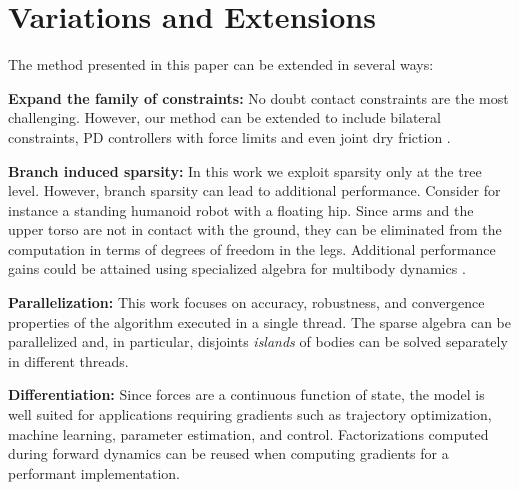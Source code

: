 \section{Variations and Extensions}
\label{sec:variations_and_extensions}

The method presented in this paper can be extended in several ways:

\textbf{Expand the family of constraints:} No doubt contact constraints are the
most challenging. However, our method can be extended to include bilateral
constraints, PD controllers with force limits and even joint dry friction
\cite{bib:todorov2014}.

\textbf{Branch induced sparsity:} In this work we exploit sparsity only at the
tree level. However, branch sparsity can lead to additional performance.
Consider for instance a standing humanoid robot with a floating hip. Since arms and the upper
torso are not in contact with the ground, they can be eliminated from the
computation in terms of degrees of freedom in the legs. Additional performance
gains could be attained using specialized algebra for multibody dynamics
\cite{bib:carpentier2021}.

\textbf{Parallelization:} This work focuses on accuracy, robustness, and
convergence properties of the algorithm executed in a single thread. The sparse
algebra can be parallelized and, in particular, disjoints \emph{islands} of
bodies can be solved separately in different threads.


\textbf{Differentiation:} Since forces are a continuous function of state, the
model is well suited for applications requiring gradients such as trajectory
optimization, machine learning, parameter estimation, and control.
Factorizations computed during forward dynamics can be reused when computing
gradients for a performant implementation.
